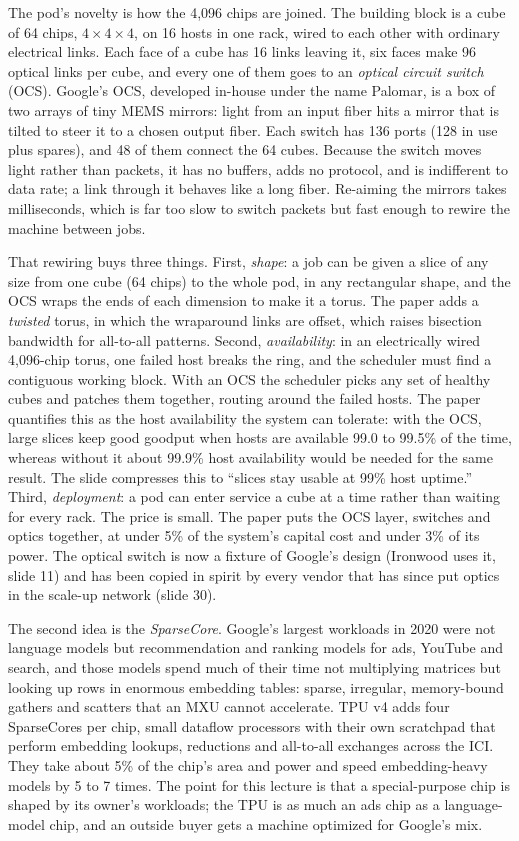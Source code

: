 \documentclass[11pt,letterpaper]{article}
\begin{document}
The pod's novelty is how the 4{,}096 chips are joined. The building block is a cube of 64 chips, $4 \times 4 \times 4$, on 16 hosts in one rack, wired to each other with ordinary electrical links. Each face of a cube has 16 links leaving it, six faces make 96 optical links per cube, and every one of them goes to an \emph{optical circuit switch} (OCS). Google's OCS, developed in-house under the name Palomar, is a box of two arrays of tiny MEMS mirrors: light from an input fiber hits a mirror that is tilted to steer it to a chosen output fiber. Each switch has 136 ports (128 in use plus spares), and 48 of them connect the 64 cubes. Because the switch moves light rather than packets, it has no buffers, adds no protocol, and is indifferent to data rate; a link through it behaves like a long fiber. Re-aiming the mirrors takes milliseconds, which is far too slow to switch packets but fast enough to rewire the machine between jobs.

That rewiring buys three things. First, \emph{shape}: a job can be given a slice of any size from one cube (64 chips) to the whole pod, in any rectangular shape, and the OCS wraps the ends of each dimension to make it a torus. The paper adds a \emph{twisted} torus, in which the wraparound links are offset, which raises bisection bandwidth for all-to-all patterns. Second, \emph{availability}: in an electrically wired 4{,}096-chip torus, one failed host breaks the ring, and the scheduler must find a contiguous working block. With an OCS the scheduler picks any set of healthy cubes and patches them together, routing around the failed hosts. The paper quantifies this as the host availability the system can tolerate: with the OCS, large slices keep good goodput when hosts are available 99.0 to 99.5\% of the time, whereas without it about 99.9\% host availability would be needed for the same result. The slide compresses this to ``slices stay usable at 99\% host uptime.'' Third, \emph{deployment}: a pod can enter service a cube at a time rather than waiting for every rack. The price is small. The paper puts the OCS layer, switches and optics together, at under 5\% of the system's capital cost and under 3\% of its power. The optical switch is now a fixture of Google's design (Ironwood uses it, slide 11) and has been copied in spirit by every vendor that has since put optics in the scale-up network (slide 30).

The second idea is the \emph{SparseCore}. Google's largest workloads in 2020 were not language models but recommendation and ranking models for ads, YouTube and search, and those models spend much of their time not multiplying matrices but looking up rows in enormous embedding tables: sparse, irregular, memory-bound gathers and scatters that an MXU cannot accelerate. TPU v4 adds four SparseCores per chip, small dataflow processors with their own scratchpad that perform embedding lookups, reductions and all-to-all exchanges across the ICI. They take about 5\% of the chip's area and power and speed embedding-heavy models by 5 to 7 times. The point for this lecture is that a special-purpose chip is shaped by its owner's workloads; the TPU is as much an ads chip as a language-model chip, and an outside buyer gets a machine optimized for Google's mix.
\end{document}
